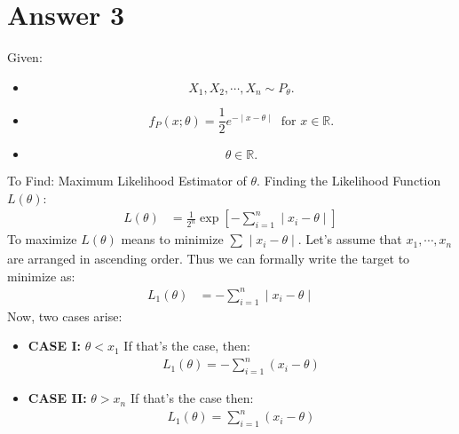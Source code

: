 \documentclass[a4paper]{article}
\begin{document}
\section{Answer 3}
Given:
\begin{itemize}
	\item {\[
				X_1,X_2,\cdots,X_n \sim P_{\theta}
	.\] }
\item{\[
	f_P\left( x;\theta \right) = \frac{1}{2} e^{- \mid x-\theta \mid } \; \text{ for } x\in \mathbb{R}
.\] }
\item{\[
	\theta \in \mathbb{R}
.\] }
\end{itemize}
To Find: Maximum Likelihood Estimator of $\theta$.
 \newline\newline
 Finding the Likelihood Function $L\left( \theta \right) $:
 \begin{equation*}
 	\begin{split}
 		L\left( \theta \right) &= \frac{1}{2^{n}} \exp\left[ -\sum_{i=1}^{n}  \mid x_i - \theta \mid  \right] 
 	\end{split}
 \end{equation*}
 To maximize $L\left( \theta \right) $ means to minimize $\sum_{}^{}  \mid x_i - \theta \mid $.
\newline\newline
Let's assume that $x_1,\cdots,x_n$ are arranged in ascending order. Thus we can formally write the target to minimize as:
\begin{equation*}
	\begin{split}
		L_1\left( \theta \right) &= -\sum_{i=1}^{n} \mid 	x_i - \theta\mid 
	\end{split}
\end{equation*}
Now, two cases arise:
\begin{itemize}
	\item {\textbf{CASE I:} $\theta < x_1$
		\newline\newline
		If that's the case, then:
		\begin{equation*}
			\begin{split}
			L_1\left( \theta \right)  = -\sum_{i=1}^{n}   \left( x_{i} - \theta \right)  
			\end{split}
		\end{equation*}	
		}
	\item{\textbf{CASE II:} $\theta > x_n$ 
		\newline\newline
		If that's the case then:
		\begin{equation*}
			\begin{split}
				L_1\left( \theta \right) = \sum_{i=1}^{n} \left( x_{i}-\theta \right) 
			\end{split}
		\end{equation*}	
		}
\end{itemize}
\end{document}
